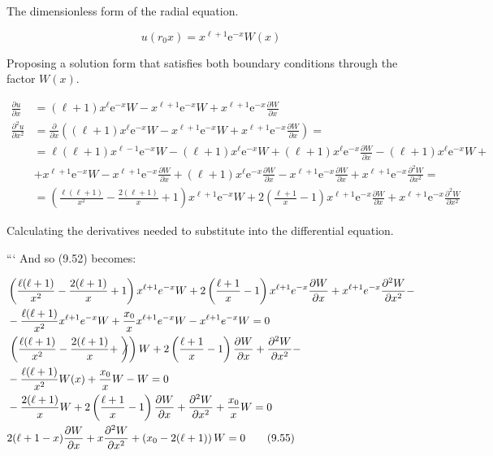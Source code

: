 \documentclass[italian]{HKNdocument}
\begin{document}
The dimensionless form of the radial equation.

\begin{equation*}
u\left(r_{0} x\right)=x^{\ell+1} \mathrm{e}^{-x} W(x) \tag{9.53}
\end{equation*}

Proposing a solution form that satisfies both boundary conditions through the factor $W(x)$.

\begin{align*}
\frac{\partial u}{\partial x} & =(\ell+1) x^{\ell} \mathrm{e}^{-x} W-x^{\ell+1} \mathrm{e}^{-x} W+x^{\ell+1} \mathrm{e}^{-x} \frac{\partial W}{\partial x} \\
\frac{\partial^{2} u}{\partial x^{2}} & =\frac{\partial}{\partial x}\left((\ell+1) x^{\ell} \mathrm{e}^{-x} W-x^{\ell+1} \mathrm{e}^{-x} W+x^{\ell+1} \mathrm{e}^{-x} \frac{\partial W}{\partial x}\right)= \\
& =\ell(\ell+1) x^{\ell-1} \mathrm{e}^{-x} W-(\ell+1) x^{\ell} \mathrm{e}^{-x} W+(\ell+1) x^{\ell} \mathrm{e}^{-x} \frac{\partial W}{\partial x}-(\ell+1) x^{\ell} \mathrm{e}^{-x} W+ \\
& +x^{\ell+1} \mathrm{e}^{-x} W-x^{\ell+1} \mathrm{e}^{-x} \frac{\partial W}{\partial x}+(\ell+1) x^{\ell} \mathrm{e}^{-x} \frac{\partial W}{\partial x}-x^{\ell+1} \mathrm{e}^{-x} \frac{\partial W}{\partial x}+x^{\ell+1} \mathrm{e}^{-x} \frac{\partial^{2} W}{\partial x^{2}}= \\
& =\left(\frac{\ell(\ell+1)}{x^{2}}-\frac{2(\ell+1)}{x}+1\right) x^{\ell+1} \mathrm{e}^{-x} W+2\left(\frac{\ell+1}{x}-1\right) x^{\ell+1} \mathrm{e}^{-x} \frac{\partial W}{\partial x}+x^{\ell+1} \mathrm{e}^{-x} \frac{\partial^{2} W}{\partial x^{2}} \tag{9.54}
\end{align*}

Calculating the derivatives needed to substitute into the differential equation.

```
And so (9.52) becomes:

\begin{align*}
& \left(\frac{\ell(\ell+1)}{x^{2}}-\frac{2(\ell+1)}{x}+1\right) x^{\ell+1} e^{-x} W+2\left(\frac{\ell+1}{x}-1\right) x^{\ell+1} e^{-x} \frac{\partial W}{\partial x}+x^{\ell+1} e^{-x} \frac{\partial^{2} W}{\partial x^{2}}- \\
& -\frac{\ell(\ell+1)}{x^{2}} x^{\ell+1} e^{-x} W+\frac{x_{0}}{x} x^{\ell+1} e^{-x} W-x^{\ell+1} e^{-x} W=0 \\
& \left.\left(\frac{\ell(\ell+1)}{x^{2}}-\frac{2(\ell+1)}{x}+\not\right)\right) W+2\left(\frac{\ell+1}{x}-1\right) \frac{\partial W}{\partial x}+\frac{\partial^{2} W}{\partial x^{2}}- \\
& -\frac{\ell(\ell+1)}{x^{2}} W(x)+\frac{x_{0}}{x} W- W = 0 \\
& -\frac{2(\ell+1)}{x} W+2\left(\frac{\ell+1}{x}-1\right) \frac{\partial W}{\partial x}+\frac{\partial^{2} W}{\partial x^{2}}+\frac{x_{0}}{x} W=0 \\
& 2(\ell+1-x) \frac{\partial W}{\partial x}+x \frac{\partial^{2} W}{\partial x^{2}}+\left(x_{0}-2(\ell+1)\right) W=0 \tag{9.55}
\end{align*}
\end{document}
